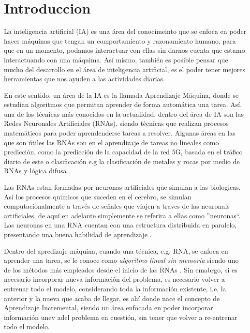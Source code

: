 \section{Introduccion}

    La inteligencia artificial (IA) es una área del conocimeinto que se enfoca en poder hacer máquinas 
    que tengan un comportamiento y razonamiento humano, para que en un momento,  podamos interactuar con 
    ellas sin darnos cuenta que estamo interactuando con una máquima. Así mismo,  también es posible 
    pensar que mucho del desarrollo en el área de inteligencia artificial, es el poder tener 
    mejores herramientas que nos ayuden a las actividades diarias. 

    En este sentido, un área de la IA es la llamada Aprendizaje Máquina, donde se estudian algoritmos
    que permitan aprender de forma automática una tarea. Así, una de las técnicas más conocidas en la 
    actualidad, dentro del área de IA son las Redes Neuronales Artificiales (RNAs), siendo técnicas que 
    realizan procesos matem\'aticos para poder aprendenderse tareas a resolver.  Algunas áreas en las que
    son útiles las RNAs son en el aprendizaje de tareas no lineales como predicción, como la predicción de
    la capacidad de la red 5G, basada en el tráfico diario de este \cite{zhao2022} o clasificación e.g 
    la clasificación de metales y rocas por medio de RNAs y lógica difusa \cite{salazar2013}.

    Las RNAs estan formadas por neuronas artificiales que simulan a las biologicas. Así los procesos
    quimicos que suceden en el cerebro, se simulan computacionalmente a través de señales que viajen
    a traves de las neuronals artificiales, de aquí en adelante simplemente se referira a ellas como 
    ''neuronas``. Las neuronas en una RNA cuentan con una estructura distribuida en paralelo, presentando 
    una buena habilidad de aprendizaje \cite{liu2015}.

    Dentro del apredizaje máquina, cuando una técnica, e.g. RNA, se enfoca en aprender una tarea, se le 
    conoce como \textit{algoritmo lineal sin memoria} siendo uno de los métodos más empleados desde el
    inicio de las RNAs \cite{GiraudCarrier2000}. Sin emabrgo, si es necesario incorporar nueva
    información del problema,  es necesario volver a entrenar todo el modelo, considerando toda 
    la información existente, i.e. la anterior y la nueva que acaba de llegar, es ahí donde nace el
    concepto de Aprendizaje Incremental, siendo un área enfocada en poder incorporar información 
    unev adel problema en cuestión, sin tener que volver a re-entrenar todo el modelo.

